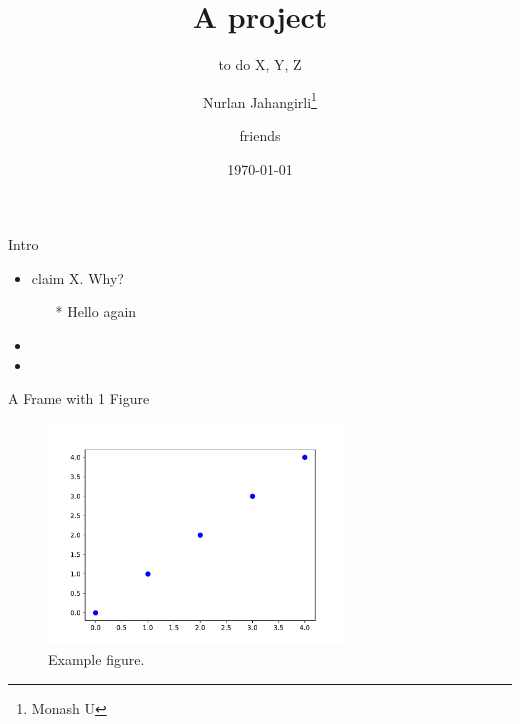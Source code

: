 \documentclass[10pt]{beamer}
\title{A project}
\subtitle{to do X, Y, Z}
\author{Nurlan Jahangirli\thanks{Monash U \njahangirliEmail} \\\and friends}
\date{\today}
\begin{document}
\begin{frame}
\maketitle
\end{frame}


\begin{frame}{Intro}

\begin{itemize} 
	\item  \citet{rajan1998financial} claim X. Why?
	\begin{itemize}
		\item[*]  Hello again
	\end{itemize}
	\item 
	\item 
\end{itemize}

\end{frame}

 
 

\begin{frame}[label=main]{A Frame with 1 Figure}


\begin{figure}[H]
\includegraphics[width=0.7\textwidth]{figures/chart.pdf}
\caption{Example figure. \label{fig:example}}
\end{figure}	
\hyperlink{supplemental}{}

\end{frame}
\end{document}
